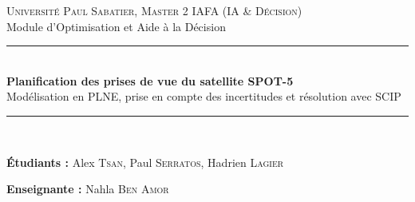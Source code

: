 \documentclass[a4paper,11pt]{article}
\begin{document}
\begin{center}
    {\large\scshape Université Paul Sabatier, Master 2 IAFA (IA \& Décision)}\\[0.2cm]
    {\normalsize Module d'Optimisation et Aide à la Décision}\\[0.5cm]
    
    \rule{\linewidth}{0.8pt}\\[0.3cm]
    {\LARGE\bfseries\color{primary} Planification des prises de vue du satellite SPOT-5}\\[0.15cm]
    {\large Modélisation en PLNE, prise en compte des incertitudes et résolution avec SCIP}\\[0.2cm]
    \rule{\linewidth}{0.8pt}\\[0.4cm]
    
    \begin{minipage}{0.60\textwidth}
        \begin{flushleft}
            \textbf{Étudiants :} Alex \textsc{Tsan}, Paul \textsc{Serratos}, Hadrien \textsc{Lagier}
        \end{flushleft}
    \end{minipage}
    \begin{minipage}{0.36\textwidth}
        \begin{flushright}
            \textbf{Enseignante :} Nahla \textsc{Ben Amor}
        \end{flushright}
    \end{minipage}
\end{center}

\renewcommand{\abstractname}{\large\bfseries\color{primary} Résumé}

\begin{abstract}
    Ce travail porte sur la modélisation et la résolution du problème d'ordonnancement des prises de vue pour un satellite d'observation terrestre (type SPOT-5). Le problème consiste à sélectionner un ensemble d'images (mono ou stéréo) et à les affecter aux trois instruments embarqués afin de maximiser le gain espéré, tout en respectant la capacité mémoire du satellite, les contraintes de non-chevauchement temporel et les temps de dépointage des miroirs. Nous intégrons les incertitudes sur la couverture nuageuse et sur les pannes d'instruments directement dans l'espérance de gain de la fonction objectif. Le modèle est formulé en Programmation Linéaire en Nombres Entiers (PLNE) et résolu avec le solveur SCIP via \texttt{PySCIPOpt}. Nous présentons ensuite la validation sur des petites instances, puis l'analyse détaillée des plans obtenus sur les instances \texttt{spotProba4} et \texttt{spotProba5}, en étudiant notamment la réaction du modèle face à une défaillance instrumentale et aux variations météorologiques.
\end{abstract}
\end{document}
